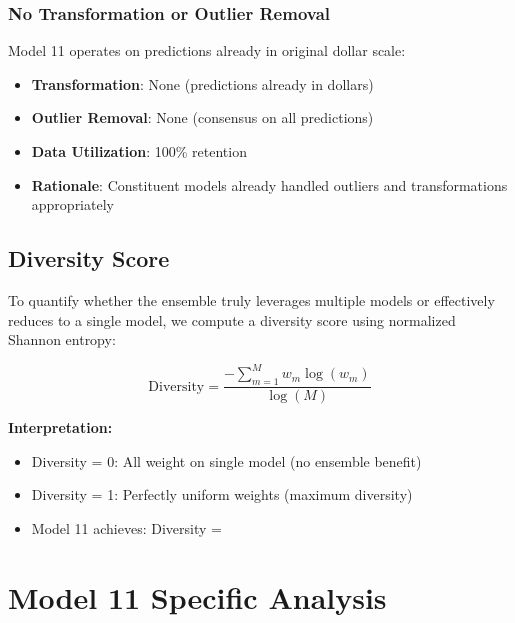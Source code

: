 \subsubsection{No Transformation or Outlier Removal}

Model 11 operates on predictions already in original dollar scale:
\begin{itemize}
    \item \textbf{Transformation}: None (predictions already in dollars)
    \item \textbf{Outlier Removal}: None (consensus on all predictions)
    \item \textbf{Data Utilization}: 100\% retention
    \item \textbf{Rationale}: Constituent models already handled outliers and transformations appropriately
\end{itemize}

\subsection{Diversity Score}

To quantify whether the ensemble truly leverages multiple models or effectively reduces to a single model, we compute a diversity score using normalized Shannon entropy:

\begin{equation}
\text{Diversity} = \frac{-\sum_{m=1}^{M} w_m \log(w_m)}{\log(M)}
\end{equation}

\textbf{Interpretation:}
\begin{itemize}
    \item Diversity = 0: All weight on single model (no ensemble benefit)
    \item Diversity = 1: Perfectly uniform weights (maximum diversity)
    \item Model 11 achieves: Diversity = \ModelElevenDiversityScore{}
\end{itemize}

\newpage



\section{Model 11 Specific Analysis}

